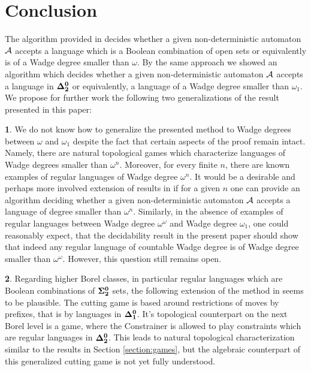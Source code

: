 
\section{Conclusion}
The algorithm provided in \cite{bp} decides whether a given non-deterministic automaton ${\mathcal A}$ accepts a language which is a Boolean combination of open sets or equivalently is of a  Wadge degree smaller than $\omega$. 
By the same approach we showed an algorithm which decides whether a given non-deterministic automaton ${\mathcal A}$ accepts a language in ${\bf \Delta^0_2}$ or equivalently, a language of a Wadge degree smaller than $\omega_1$. 
We propose for further work the following two generalizations of the result presented in this paper:

\noindent
{\bf 1}. We do not know how to generalize the presented method to Wadge degrees between $\omega$ and $\omega_1$ despite the fact that certain aspects of the proof remain intact. Namely, there are natural topological games which characterize languages of Wadge degrees smaller than $\omega^n$. Moreover, for every finite $n$, there are known examples of regular languages of Wadge degree $\omega^n$. It would be a desirable and perhaps more involved extension of results in \cite{bp} if for a given $n$ one can provide an algorithm deciding whether a given non-deterministic automaton ${\mathcal A}$ accepts a language of degree smaller than $\omega^n$. Similarly, in the absence of examples of regular languages between Wadge degree $\omega^\omega$ and Wadge degree $\omega_1$, one could reasonably expect, that the decidability result in the present paper should show that indeed any regular language of countable Wadge degree is of Wadge degree smaller than $\omega^\omega$. However, this question still remains open.  

\noindent
{\bf 2}. Regarding higher Borel classes, in particular regular languages which are Boolean combinations of ${\bf \Sigma^0_2}$ sets, the following extension of the method in \cite{bp} seems to be plausible. The cutting game is based around restrictions of moves by prefixes, that is 
by languages in ${\bf \Delta^0_1}$. It's  topological counterpart on the next Borel level is a game, where the Constrainer is allowed to play constraints which are regular languages in ${\bf \Delta^0_2}$. This leads to natural topological characterization similar to the results in Section \ref{section:games}, but the algebraic counterpart of this generalized cutting game is not yet fully understood.
